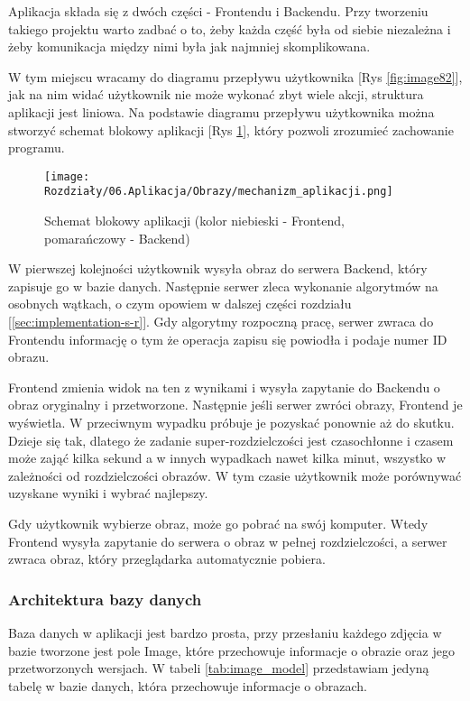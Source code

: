 Aplikacja składa się z dwóch części - Frontendu i Backendu. Przy tworzeniu takiego projektu warto zadbać o to, żeby każda część była od siebie niezależna i żeby komunikacja między nimi była jak najmniej skomplikowana.

W tym miejscu wracamy do diagramu przepływu użytkownika [Rys \ref{fig:image82}], jak na nim widać użytkownik nie może wykonać zbyt wiele akcji, struktura aplikacji jest liniowa. Na podstawie diagramu przepływu użytkownika można stworzyć schemat blokowy aplikacji [Rys \ref{fig:image87}], który pozwoli zrozumieć zachowanie programu.

\begin{figure}[H]
    \centering
    \texttt{[image: Rozdziały/06.Aplikacja/Obrazy/mechanizm\_aplikacji.png]}  
    \caption{Schemat blokowy aplikacji (kolor niebieski - Frontend, pomarańczowy - Backend)}
    \label{fig:image87}
\end{figure}

W pierwszej kolejności użytkownik wysyła obraz do serwera Backend, który zapisuje go w bazie danych. Następnie serwer zleca wykonanie algorytmów na osobnych wątkach, o czym opowiem w dalszej części rozdziału [\ref{sec:implementation-s-r}]. Gdy algorytmy rozpoczną pracę, serwer zwraca do Frontendu informację o tym że operacja zapisu się powiodła i podaje numer ID obrazu. 

Frontend zmienia widok na ten z wynikami i wysyła zapytanie do Backendu o obraz oryginalny i przetworzone. Następnie jeśli serwer zwróci obrazy, Frontend je wyświetla. W przeciwnym wypadku próbuje je pozyskać ponownie aż do skutku. Dzieje się tak, dlatego że zadanie super-rozdzielczości jest czasochłonne i czasem może zająć kilka sekund a w innych wypadkach nawet kilka minut, wszystko w zależności od rozdzielczości obrazów. W tym czasie użytkownik może porównywać uzyskane wyniki i wybrać najlepszy. 

Gdy użytkownik wybierze obraz, może go pobrać na swój komputer. Wtedy Frontend wysyła zapytanie do serwera o obraz w pełnej rozdzielczości, a serwer zwraca obraz, który przeglądarka automatycznie pobiera.

\subsubsection*{Architektura bazy danych}

Baza danych w aplikacji jest bardzo prosta, przy przesłaniu każdego zdjęcia w bazie tworzone jest pole Image, które przechowuje informacje o obrazie oraz jego przetworzonych wersjach. W tabeli \ref{tab:image_model} przedstawiam jedyną tabelę w bazie danych, która przechowuje informacje o obrazach.

